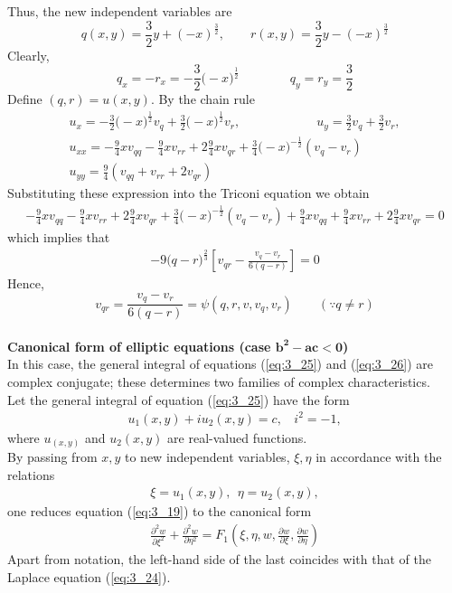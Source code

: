 \documentclass[11pt]{report}
\newcommand{\NI}{\noindent}
\newcommand{\sps}{\\[0.2cm]}
\newcommand{\refn}[1]{(\ref{#1})}
\newcommand{\refx}[1]{\refn{eq:#1}}
\newcommand{\bt}[1]{\textbf{#1}}
\begin{document}
	\NI Thus, the new independent variables are
	\begin{equation}
		q(x,y) = \frac{3}{2}y+(-x)^{\frac{3}{2}}, \qquad  r(x,y)=\frac{3}{2}y-(-x)^{\frac{3}{2}}\label{ex:3_3_7} \tag{7}
	\end{equation}
	Clearly,
	\begin{equation}
		q_x = -r_x = -\frac{3}{2}\Big(-x\Big)^{\frac{1}{2}}\qquad\qquad q_y = r_y = \frac{3}{2}\label{ex:3_3_8} \tag{8}
	\end{equation}
	Define $(q,r) = u(x,y)$. By the chain rule
	\begin{equation*}
		\begin{array}{l}
			u_x = -\frac{3}{2}\Big(-x\Big)^{\frac{1}{2}}v_q + \frac{3}{2}\Big(-x\Big)^{\frac{1}{2}}v_r,\qquad\qquad\qquad u_y = \frac{3}{2}v_q + \frac{3}{2}v_r,\\
			u_{xx} = - \frac{9}{4}xv_{qq} - \frac{9}{4}xv_{rr} + 2\frac{9}{4}xv_{qr}+\frac{3}{4}\Big(-x\Big)^{-\frac{1}{2}}(v_q-v_r)\\
			u_{yy} = \frac{9}{4}(v_{qq}+v_{rr}+2v_{qr})
		\end{array}
	\end{equation*}
	Substituting these expression into the Triconi equation we obtain
	\begin{eqnarray*}
		- \frac{9}{4}xv_{qq} - \frac{9}{4}xv_{rr} + 2\frac{9}{4}xv_{qr}+\frac{3}{4}\Big(-x\Big)^{-\frac{1}{2}}(v_q-v_r)+ \frac{9}{4}xv_{qq} + \frac{9}{4}xv_{rr} + 2\frac{9}{4}xv_{qr}=0
	\end{eqnarray*}
	which implies that
	\begin{eqnarray*}
		-9\Big(q-r\Big)^{\frac{2}{3}}\left[v_{qr}-\frac{v_q - v_r}{6(q-r)}\right] = 0
	\end{eqnarray*}
	Hence,
	\begin{equation}
		v_{qr} = \frac{v_q - v_r}{6(q-r)} = \psi(q,r,v,v_q,v_r)\qquad (\because q \neq r)\label{ex:3_3_9} \tag{9}
	\end{equation}
	{~}\sps

	\NI\bt{Canonical form of elliptic equations (case $\mathbf{b^2-ac<0}$)}\\
	In this case, the general integral of equations \refx{3_25} and \refx{3_26} are complex conjugate; these determines two families of complex characteristics.\\
	Let the general integral of equation \refx{3_25} have the form
	\begin{eqnarray*}
		u_1(x,y)+iu_2(x,y)=c, ~~~~ i^2 = -1,
	\end{eqnarray*}
	where $u_(x,y)$ and $u_2(x,y)$ are real-valued functions.\sps
	By passing from $x,y$ to new independent variables, $\xi, \eta$ in accordance with the relations
	\begin{eqnarray*}
		\xi = u_1(x,y),~~ \eta=u_2(x,y),
	\end{eqnarray*}
	one reduces equation \refx{3_19} to the canonical form
	\begin{eqnarray*}
		\frac{\partial^2 w}{\partial \xi^2} + \frac{\partial^2 w}{\partial \eta^2} = F_1\left(\xi,\eta,w,\frac{\partial w}{\partial\xi},\frac{\partial w}{\partial\eta}\right)
	\end{eqnarray*}
	Apart from notation, the left-hand side of the last coincides with that of the Laplace equation \refx{3_24}.
	
\end{document}
